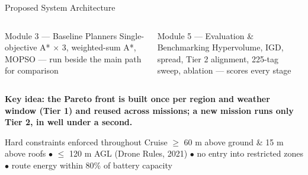 \documentclass[aspectratio=169,11pt]{beamer}
\newcommand{\compactblocks}{\setbeamerfont{block title}{size=\small}}
\begin{document}
\begin{frame}{Proposed System Architecture}
  \compactblocks
  \centering
  \vspace{2mm}

  \scriptsize
  \begin{columns}[T,onlytextwidth]
      \begin{block}{Module 3 --- Baseline Planners}
        Single-objective A* $\times$ 3, weighted-sum A*, MOPSO --- run beside the main path for comparison
      \end{block}
      \begin{block}{Module 5 --- Evaluation \& Benchmarking}
        Hypervolume, IGD, spread, Tier 2 alignment, 225-tag sweep, ablation --- scores every stage
      \end{block}
  \end{columns}
  \vspace{2mm}

  \raggedright
  {\footnotesize\textbf{Key idea: the Pareto front is built once per region and weather window (Tier 1) and reused across missions; a new mission runs only Tier 2, in well under a second.}}
  \vspace{1mm}

  \begin{block}{Hard constraints enforced throughout}
    Cruise $\ge$ 60 m above ground \& 15 m above roofs $\bullet$ $\le$ 120 m AGL (Drone Rules, 2021)
    $\bullet$ no entry into restricted zones $\bullet$ route energy within 80\% of battery capacity
  \end{block}
\end{frame}
\end{document}
